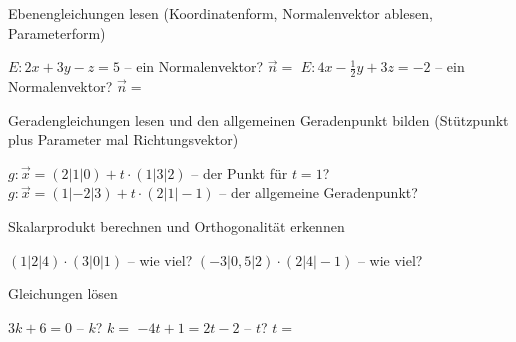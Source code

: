 \setcounter{aufgabe}{0}

\begin{aufgabe}{Ebenengleichungen lesen (Koordinatenform, Normalenvektor ablesen, Parameterform)}
\begin{teile}
\teil $E: 2x + 3y - z = 5$ – ein Normalenvektor? $\vec{n} = $ \leerfeld
\teil $E: 4x - \frac{1}{2}y + 3z = -2$ – ein Normalenvektor? $\vec{n} = $ \leerfeld
\end{teile}
\end{aufgabe}

\begin{aufgabe}{Geradengleichungen lesen und den allgemeinen Geradenpunkt bilden (Stützpunkt plus Parameter mal Richtungsvektor)}
\begin{teile}
\teil $g: \vec{x} = (2 | 1 | 0) + t \cdot (1 | 3 | 2)$ – der Punkt für $t = 1$? \leerfeld
\teil $g: \vec{x} = (1 | -2 | 3) + t \cdot (2 | 1 | -1)$ – der allgemeine Geradenpunkt? \leerfeld
\end{teile}
\end{aufgabe}

\begin{aufgabe}{Skalarprodukt berechnen und Orthogonalität erkennen}
\begin{teile}
\teil $(1 | 2 | 4) \cdot (3 | 0 | 1)$ – wie viel? \leerfeld
\teil $(-3 | 0,5 | 2) \cdot (2 | 4 | -1)$ – wie viel? \leerfeld
\end{teile}
\end{aufgabe}

\begin{aufgabe}{Gleichungen lösen}
\begin{teile}
\teil $3k + 6 = 0$ – $k$? $k = $ \leerfeld
\teil $-4t + 1 = 2t - 2$ – $t$? $t = $ \leerfeld
\end{teile}
\end{aufgabe}

